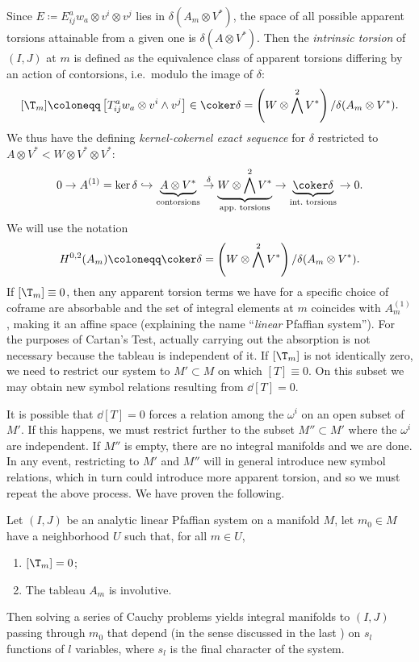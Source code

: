 Since $E\coloneqq E^a_{ij}w_a\otimes v^i\otimes v^j$ lies in $\delta(A_m\otimes V^\ast)$, the space of all possible apparent torsions attainable from a given one is $\delta(A\otimes V^\ast)$. Then the \emph{intrinsic torsion} of $(I,J)$ at $m$ is defined as the equivalence class of apparent torsions differing by an action of contorsions, i.e.\ modulo the image of $\delta$:
\[[\T_m]\coloneqq \left[T^a_{ij}w_a\otimes v^i\wedge v^j\right]\in \coker\delta =\left(W\otimes \bigwedge^2 V^\ast\right)\slash \delta(A_m\otimes V^\ast).\]
We thus have the defining \emph{kernel-cokernel exact sequence} for $\delta$ restricted to $A\otimes V^\ast<W\otimes V^\ast\otimes V^\ast$:
\[0\to A^{(1)}=\ker\delta \hookrightarrow \underbrace{A\otimes V^\ast}_{\text{contorsions}}\overset{\delta}{\to}\underbrace{W\otimes\bigwedge^2 V^\ast}_{\text{app.\ torsions}}\to \underbrace{\coker\delta}_{\text{int.\ torsions}}\to 0.\]
We will use the notation 
\[H^{0,2}(A_m)\coloneqq \coker\delta=\left(W\otimes \bigwedge^2V^\ast\right)\slash \delta(A_m\otimes V^\ast).\]
If $[\T_m]\equiv 0$, then any apparent torsion terms we have for a specific choice of coframe are absorbable and the set of integral elements at $m$ coincides with $A^{(1)}_m$, making it an affine space (explaining the name ``\emph{linear} Pfaffian system''). For the purposes of Cartan's Test, actually carrying out the absorption is not necessary because the tableau is independent of it. If $[\T_m]$ is not identically zero, we need to restrict our system to $M'\subset M$ on which $[T]\equiv 0$. On this subset we may obtain new symbol relations resulting from $\dd [T]=0$.

It is possible that $\dd[T]=0$ forces a relation among the $\omega^i$ on an open subset of $M'$. If this happens, we must restrict further to the subset $M''\subset M'$ where the $\omega^i$ are independent. If $M''$ is empty, there are no integral manifolds and we are done. In any event, restricting to $M'$ and $M''$ will in general introduce new symbol relations, which in turn could introduce more apparent torsion, and so we must repeat the above process. We have proven the following.

\begin{thm}\label{thm 6.5.6 Ivey}
    Let $(I,J)$ be an analytic linear Pfaffian system on a manifold $M$, let $m_0\in M$ have a neighborhood $U$ such that, for all $m\in U$,
    \begin{enumerate}
        \item $[\T_m]=0$;
        \item The tableau $A_m$ is involutive.
    \end{enumerate}
    Then solving a series of Cauchy problems yields integral manifolds to $(I,J)$ passing through $m_0$ that depend (in the sense discussed in the last \subsect) on $s_l$ functions of $l$ variables, where $s_l$ is the final character of the system.
\end{thm}

